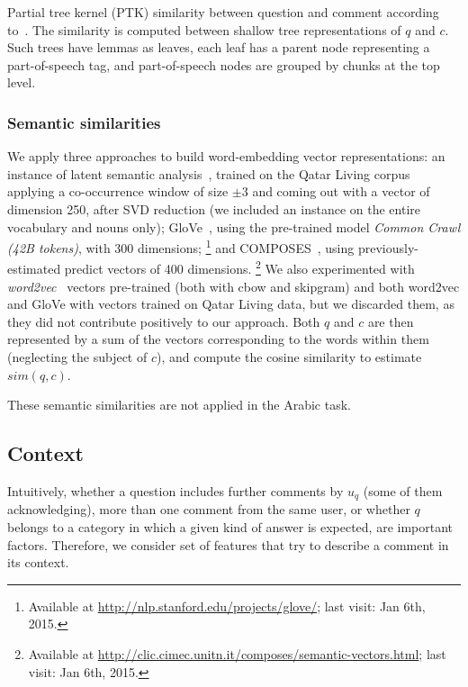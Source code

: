 Partial tree kernel (PTK) similarity between question and comment according 
to~\cite{Moschitti:2006}. The similarity is computed between shallow tree  
representations of $q$ and $c$. Such trees have lemmas as leaves, each leaf has 
a parent node representing a part-of-speech tag, and part-of-speech nodes are 
grouped by chunks at the top level.

\subsubsection{Semantic similarities}
\label{sub:semantic}

We apply three approaches to build  word-embedding vector representations:
\Ni an instance of latent semantic analysis~\cite{croce-previtali:2010:GEMS}, 
trained on the Qatar Living corpus applying a co-occurrence window of size 
$\pm3$ and coming out with a vector of dimension 250, after SVD reduction (we 
included an instance on the entire vocabulary and nouns only);
\Nii GloVe~\cite{Pennington:2014}, using the pre-trained model \textit{Common 
Crawl (42B tokens)}, with 300 dimensions;%
\footnote{Available at \url{http://nlp.stanford.edu/projects/glove/}; last 
visit: Jan 6th, 2015.}
and \Niii COMPOSES~\cite{Baroni:2014}, using previously-estimated predict 
vectors of 400 dimensions.%
\footnote{Available at 
\url{http://clic.cimec.unitn.it/composes/semantic-vectors.html}; last visit: Jan 
6th, 2015.}
We also experimented with \textit{word2vec}~\cite{Mikolov:2013} 
vectors pre-trained (both with cbow and skipgram) and both word2vec and GloVe 
with vectors trained on Qatar Living data, but we discarded them, as they did 
not contribute positively to our approach.
Both $q$ and $c$ are then represented by a sum of the vectors 
corresponding to the words within them (neglecting the subject of $c$), and 
compute the cosine similarity to estimate $sim(q,c)$. 

These semantic similarities are not applied in the Arabic task.

\subsection{Context }
\label{ssub:context}

Intuitively, whether a question includes further comments by $u_q$ (some of 
them acknowledging), more than one comment from the same user, or whether $q$ 
belongs to a category in which a given kind of answer is expected, are important 
factors. Therefore, we consider set of features that 
try to describe a comment in its context.   

